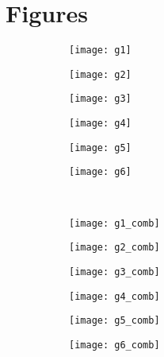 \chapter{Figures}
\label{sec:app_figures}

\begin{figure}[h]
	\centering 
	\begin{subfigure}[b]{0.16\textwidth}
		\centering
		\texttt{[image: g1]}
	\end{subfigure}
\begin{subfigure}[b]{0.16\textwidth}
	\texttt{[image: g2]}
\end{subfigure}
\begin{subfigure}[b]{0.16\textwidth}
	\texttt{[image: g3]}
\end{subfigure}
\begin{subfigure}[b]{0.16\textwidth}
	\texttt{[image: g4]}
\end{subfigure}
\begin{subfigure}[b]{0.16\textwidth}
	\texttt{[image: g5]}
\end{subfigure}
\begin{subfigure}[b]{0.16\textwidth}
	\texttt{[image: g6]}
\end{subfigure}\\
\vspace{0.3cm}
\begin{subfigure}[b]{0.16\textwidth}
	\centering
	\texttt{[image: g1\_comb]}
\end{subfigure}
\begin{subfigure}[b]{0.16\textwidth}
	\centering
	\texttt{[image: g2\_comb]}
\end{subfigure}
\begin{subfigure}[b]{0.16\textwidth}
	\centering
	\texttt{[image: g3\_comb]}
\end{subfigure}
\begin{subfigure}[b]{0.16\textwidth}
	\centering
	\texttt{[image: g4\_comb]}
\end{subfigure}
\begin{subfigure}[b]{0.16\textwidth}
	\centering
	\texttt{[image: g5\_comb]}
\end{subfigure}
\begin{subfigure}[b]{0.16\textwidth}
	\centering
	\texttt{[image: g6\_comb]}
\end{subfigure}\\
\vspace{0.3cm}

\end{figure}
